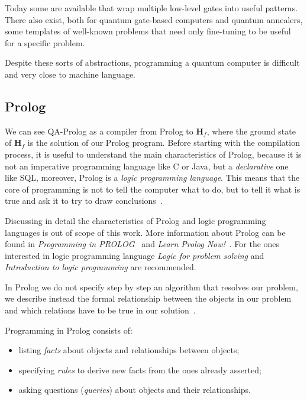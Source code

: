 Today some  are available that wrap multiple low-level gates into useful patterns. There also exist, both for quantum gate-based computers and quantum annealers, some templates of well-known problems that need only fine-tuning to be useful for a specific problem. 

Despite these sorts of abstractions, programming a quantum computer is difficult and very close to machine language.

\subsection{Prolog}
We can see QA-Prolog as a compiler from Prolog to $\mathbf{H}_f$, where the ground state of $\mathbf{H}_f$ is the solution of our Prolog program. Before starting with the compilation process, it is useful to understand the main characteristics of Prolog, because it is not an imperative programming language like C or Java, but a \emph{declarative} one like SQL, moreover, Prolog is a \emph{logic programming language}. This means that the core of programming is not to tell the computer what to do, but to tell it what is true and ask it to try to draw conclusions~\cite{clocksin2003programming}. 

Discussing in detail the characteristics of Prolog and logic programming languages is out of scope of this work. More information about Prolog can be found in  \emph{Programming in PROLOG}~\cite{clocksin2003programming} and \emph{Learn Prolog Now!}~\cite{learn_prolog_now_online}. For the ones interested in logic programming language \emph{Logic for problem solving}\cite{kowalski1982logic} and \emph{Introduction to logic programming}\cite{hogger1984introduction} are recommended.

In Prolog we do not specify step by step an algorithm that resolves our problem, we describe instead the formal relationship between the objects in our problem and which relations have to be true in our solution~\cite{clocksin2003programming}.

Programming in Prolog consists of:
\begin{itemize}
	\item listing \emph{facts} about objects and relationships between objects;
	\item specifying \emph{rules} to derive new facts from the ones already asserted;
	\item asking questions (\emph{queries}) about objects and their relationships.
\end{itemize}

